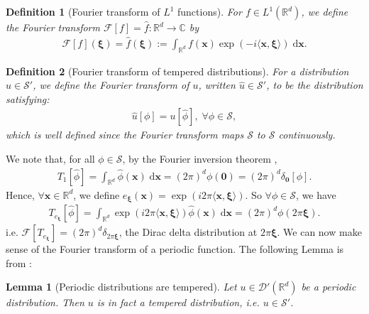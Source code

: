 \documentclass[11pt]{article}
\newcommand{\bx}{\mathbf x}
\newcommand{\calF}{\mathcal{F}}
\newcommand{\0}{\mathbf{0}}
\newtheorem{lem}{Lemma}[section]
\newtheorem{defi}{Definition}
\begin{document}
\begin{appendix}
\begin{defi}[Fourier transform of $L^1$ functions]
    For $f\in L^1(\mathbb{R}^{d})$, we define the Fourier transform $\calF[f] = \hat{f} : \mathbb{R}^{d}\to \mathbb{C}$ by 
    \begin{align*}
        \calF[f](\boldsymbol{\xi}) = \hat{f}(\boldsymbol{\xi}) := \int_{\mathbb{R}^{d}} f(\bx)\exp(-i\langle \bx, \boldsymbol{\xi}\rangle)\;\mathrm{d}\bx.
    \end{align*}
\end{defi}


\begin{defi}[Fourier transform of tempered distributions]
    For a distribution $u\in \mathcal{S}'$, we define the Fourier transform of $u$, written $\hat{u}\in \mathcal{S}'$, to be the distribution satisfying:
    \begin{align*}
        \hat{u}[\phi] = u[\hat{\phi}], \;\forall \phi\in\mathcal{S}, 
    \end{align*}
    which is well defined since the Fourier transform maps $\mathcal{S}$ to $\mathcal{S}$ continuously.
\end{defi}
We note that, for all $\phi\in \mathcal{S}$, by the Fourier inversion theorem \citep[9.11]{rudin1987real}, 
\begin{align*}
    T_{1}[\hat{\phi}] = \int_{\mathbb{R}^{d}} \hat{\phi}(\bx)\;\mathrm{d}\bx = (2\pi)^{d}\phi(\boldsymbol{0}) = (2\pi)^{d}\delta_{\boldsymbol{0}}[\phi]. 
\end{align*}
Hence, $\forall \bx\in \mathbb{R}^{d}$, we define $e_{\boldsymbol{\xi}}(\bx) = \exp(i2\pi \langle \bx, \boldsymbol{\xi}\rangle)$. 
So $\forall \phi\in \mathcal{S}$, we have
\begin{align}
\label{eq:fourier_transform_trig_poly}
    T_{e_{\boldsymbol{\xi}}}[\hat{\phi}] = \int_{\mathbb{R}^{d}} \exp(i2 \pi \langle \bx, \boldsymbol{\xi}\rangle)\hat{\phi}(\bx)\;\mathrm{d}\bx 
    = (2\pi)^{d}\phi(2\pi \boldsymbol{\xi}).
\end{align}
i.e. $\calF[T_{e_{\boldsymbol{\xi}}}] = (2\pi)^{d}\delta_{2\pi \boldsymbol{\xi}}$, the Dirac delta distribution at $2\pi \boldsymbol{\xi}$. %
We can now make sense of the Fourier transform of a periodic function. The following Lemma is from \citet[8.5]{friedlander1998introduction}:
\begin{lem}[Periodic distributions are tempered]
\label{lem:periodic_distributions_tempered}
    Let $u\in \mathcal{D}'(\mathbb{R}^{d})$ be a periodic distribution. Then $u$ is in fact a tempered distribution, i.e. $u\in \mathcal{S}'$.

\end{lem}
\end{appendix}
\end{document}
